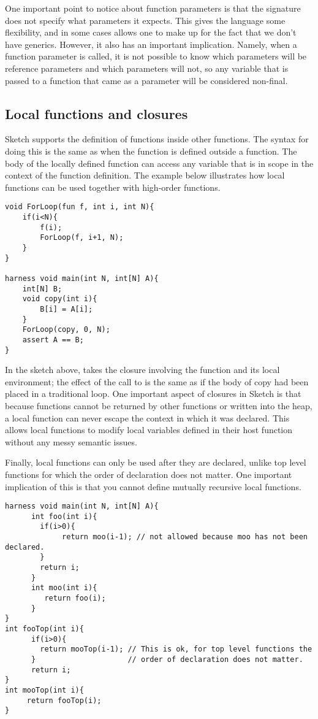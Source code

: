 One important point to notice about function parameters is that the signature does not specify what parameters it expects. This gives the language some flexibility, and in some cases allows one to make up for the fact that we don't have generics. However, it also has an important implication. Namely, when a function parameter is called, it is not possible to know which parameters will be reference parameters and which parameters will not, so any variable that is passed to a function that came as a parameter will be considered non-final.

\subsection{Local functions and closures}
Sketch supports the definition of functions inside other functions. The syntax for doing this is the same as when the function is defined outside a function. The body of the locally defined function can access any variable that is in scope in the context of the function definition. The example below illustrates how local functions can be used together with high-order functions. 

\begin{lstlisting}
void ForLoop(fun f, int i, int N){
	if(i<N){
		f(i);
		ForLoop(f, i+1, N);
	}
}

harness void main(int N, int[N] A){
	int[N] B;
	void copy(int i){
		B[i] = A[i];
	}
	ForLoop(copy, 0, N);
	assert A == B;
}
\end{lstlisting}
	
In the sketch above,  takes the closure involving the function  and its local environment; the effect of the call to  is the same as if the body of copy had been placed in a traditional  loop. 
One important aspect of closures in Sketch is that because functions cannot be returned by other functions or written into the heap, a local function can never escape the context in which it was declared. This allows local functions to modify local variables defined in their host function without any messy semantic issues.

Finally, local functions can only be used after they are declared, unlike top level functions for which the order of declaration does not matter. One important implication of this is that you cannot define mutually recursive local functions.

\begin{lstlisting}
harness void main(int N, int[N] A){
      int foo(int i){
        if(i>0){
             return moo(i-1); // not allowed because moo has not been declared.
        }
        return i;
      }
      int moo(int i){
         return foo(i);
      }
}
int fooTop(int i){
      if(i>0){
        return mooTop(i-1); // This is ok, for top level functions the 
      }                     // order of declaration does not matter.
      return i;
}
int mooTop(int i){
     return fooTop(i);
}
\end{lstlisting}


